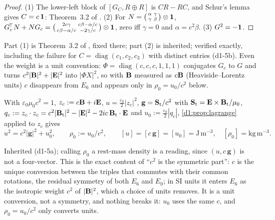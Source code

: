 \begin{proof}
(1) The lower-left block of $[G_C,R\oplus R]$ is $CR-RC$, and Schur's lemma gives $C=c\,\mathbf 1$: Theorem~3.2 of \cite{ES17}. (2) For
$N=\bigl(\begin{smallmatrix}\alpha&\gamma\\ \gamma&\beta\end{smallmatrix}\bigr)\otimes\mathbf 1$,
$G_c^{\!\top}N+NG_c=\bigl(\begin{smallmatrix}2c\gamma&c\beta-\alpha/c\\ c\beta-\alpha/c&-2\gamma/c\end{smallmatrix}\bigr)\otimes\mathbf 1$, zero iff
$\gamma=0$ and $\alpha=c^2\beta$. (3) $G^2=-\mathbf 1$.
\end{proof}

Part (1) is Theorem~3.2 of \cite{ES17}, fixed there; part (2) is inherited; verified exactly, including the failure for
$C=\operatorname{diag}(c_1,c_2,c_3)$ with distinct entries (d1-5b). Even the weight is a unit convention: $\Phi=\operatorname{diag}(c,c,c,1,1,1)$
conjugates $G_c$ to $G$ and turns $c^2|\mathbf B|^2+|\mathbf E|^2$ into $|\Phi X|^2$, so with $\mathbf B$ measured as $c\mathbf B$ (Heaviside--Lorentz units) $c$ disappears from
$E_6$ and appears only in $\rho_0=u_0/c^2$ below.

\begin{proposition}[SI form]
\label{d1:prop:SI}
With $\varepsilon_0\mu_0c^2=1$, $z_c:=c\mathbf B+i\mathbf E$, $u=\tfrac{\varepsilon_0}2|z_c|^2$, $\mathbf g=\mathbf S_{\rm t}/c^2$ with $\mathbf S_{\rm t}=\mathbf E\times\mathbf B_{\rm t}/\mu_0$,
$q_c:=z_c\cdot z_c=c^2|\mathbf B_{\rm t}|^2-|\mathbf E|^2-2ic\,\mathbf B_{\rm t}\cdot\mathbf E$ and $u_0:=\tfrac{\varepsilon_0}2|q_c|$, \cref{d1:prop:lagrange} applied to $z_c$ gives
\begin{equation}
\label{d1:eq:SI}
u^2=c^2|\mathbf g|^2+u_0^2,\qquad \rho_0:=u_0/c^2,\qquad [u]=[c\,\mathbf g]=[u_0]=\mathrm{J\,m^{-3}},\quad [\rho_0]=\mathrm{kg\,m^{-3}} .
\end{equation}
\end{proposition}

Inherited (d1-5a); calling $\rho_0$ a rest-mass density is a reading, since $(u,c\,\mathbf g)$ is not a four-vector. This is the exact content of
``$c^2$ is the symmetric part'': $c$ is the unique conversion between the triples that commutes with their common rotations, the residual symmetry of
both $E_6$ and $E_0$; in SI units it enters $E_6$ as the isotropic weight $c^2$ of $|\mathbf B|^2$, which a choice of units removes. It is a unit conversion,
not a symmetry, and nothing breaks it: $u_0$ uses the same $c$, and $\rho_0=u_0/c^2$ only converts units.

